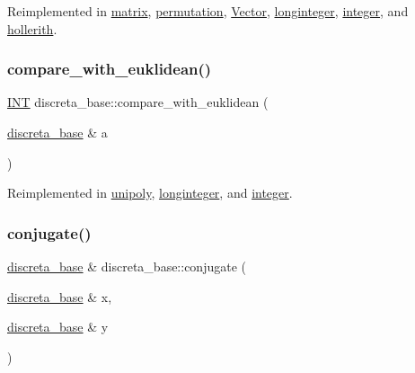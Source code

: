 Reimplemented in \mbox{\hyperlink{classmatrix_a6009a90834a208f5f0a83d8ed651e4c5}{matrix}}, \mbox{\hyperlink{classpermutation_ae331b031f81647c88e72e966555c9c8f}{permutation}}, \mbox{\hyperlink{class_vector_a5fc27308a2710188b16f92df56c79c55}{Vector}}, \mbox{\hyperlink{classlonginteger_aaa504bac9b133d50b5ac50768f97db9d}{longinteger}}, \mbox{\hyperlink{classinteger_a20cc8d8d4913e9ee746c6758bbb2e62a}{integer}}, and \mbox{\hyperlink{classhollerith_a9dfd88b7057204bd4ea1ec227f05d84a}{hollerith}}.

\mbox{\label{classdiscreta__base_a9d3091feb2fbc69359c2a45f11ceec9e}} 
\subsubsection{\texorpdfstring{compare\+\_\+with\+\_\+euklidean()}{compare\_with\_euklidean()}}
{\footnotesize\ttfamily \mbox{\hyperlink{galois_8h_a09fddde158a3a20bd2dcadb609de11dc}{I\+NT}} discreta\+\_\+base\+::compare\+\_\+with\+\_\+euklidean (\begin{DoxyParamCaption}\item[{\mbox{\hyperlink{classdiscreta__base}{discreta\+\_\+base}} \&}]{a }\end{DoxyParamCaption})\hspace{0.3cm}{\ttfamily [virtual]}}



Reimplemented in \mbox{\hyperlink{classunipoly_ae51f546d1fadd05e03bc71df1aa57d64}{unipoly}}, \mbox{\hyperlink{classlonginteger_a71b27b9c767c0da8964151323810f315}{longinteger}}, and \mbox{\hyperlink{classinteger_a903a43b71a9f65f6b7edb443997f5f0e}{integer}}.

\mbox{\label{classdiscreta__base_a463f1481dd1a3ab42deb6162e25ba725}} 
\subsubsection{\texorpdfstring{conjugate()}{conjugate()}}
{\footnotesize\ttfamily \mbox{\hyperlink{classdiscreta__base}{discreta\+\_\+base}} \& discreta\+\_\+base\+::conjugate (\begin{DoxyParamCaption}\item[{\mbox{\hyperlink{classdiscreta__base}{discreta\+\_\+base}} \&}]{x,  }\item[{\mbox{\hyperlink{classdiscreta__base}{discreta\+\_\+base}} \&}]{y }\end{DoxyParamCaption})}

